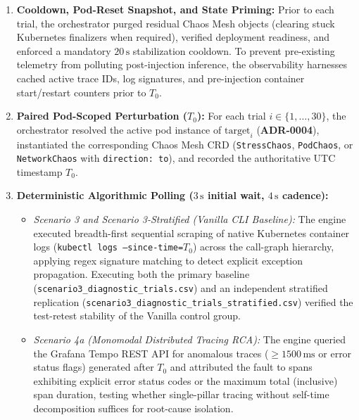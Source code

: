 \begin{enumerate}
    \item \textbf{Cooldown, Pod-Reset Snapshot, and State Priming:} Prior to each trial, the orchestrator purged residual Chaos Mesh objects (clearing stuck Kubernetes finalizers when required), verified deployment readiness, and enforced a mandatory $20\,\text{s}$ stabilization cooldown. To prevent pre-existing telemetry from polluting post-injection inference, the observability harnesses cached active trace IDs, log signatures, and pre-injection container start/restart counters prior to $T_0$.
    
    \item \textbf{Paired Pod-Scoped Perturbation ($T_0$):} For each trial $i \in \{1, \dots, 30\}$, the orchestrator resolved the active pod instance of $\text{target}_i$ (\textbf{ADR-0004}), instantiated the corresponding Chaos Mesh CRD (\texttt{StressChaos}, \texttt{PodChaos}, or \texttt{NetworkChaos} with \texttt{direction: to}), and recorded the authoritative UTC timestamp $T_0$.
    
    \item \textbf{Deterministic Algorithmic Polling ($3\,\text{s}$ initial wait, $4\,\text{s}$ cadence):}
    \begin{itemize}
        \item \textit{Scenario 3 and Scenario 3-Stratified (Vanilla CLI Baseline):} The engine executed breadth-first sequential scraping of native Kubernetes container logs (\texttt{kubectl logs --since-time=}$T_0$) across the call-graph hierarchy, applying regex signature matching to detect explicit exception propagation. Executing both the primary baseline (\texttt{scenario3\_diagnostic\_trials.csv}) and an independent stratified replication (\texttt{scenario3\_diagnostic\_trials\_stratified.csv}) verified the test-retest stability of the Vanilla control group.
        
        \item \textit{Scenario 4a (Monomodal Distributed Tracing RCA):} The engine queried the Grafana Tempo REST API for anomalous traces ($\ge 1500\,\text{ms}$ or error status flags) generated after $T_0$ and attributed the fault to spans exhibiting explicit error status codes or the maximum total (inclusive) span duration, testing whether single-pillar tracing without self-time decomposition suffices for root-cause isolation.
        

\end{itemize}
\end{enumerate}
